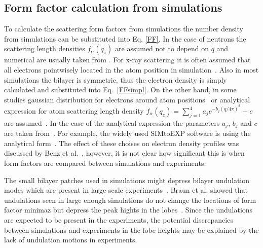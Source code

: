 \documentclass[aps,prl,superscriptaddress,twocolumn]{revtex4}
\begin{document}
\onecolumngrid
{}


\twocolumngrid

\subsection{Form factor calculation from simulations}
To calculate the scattering form factors from simulations the number density from
simulations can be substituted into Eq. \ref{FF}. In the case of neutrons the scattering 
length densities $f_\alpha(q_z)$ are assumed not to depend on $q$ and numerical are usually 
taken from \cite{??}. For x-ray scattering it is often assumed that all electrons pointwisely 
located in the atom position in simulation~\cite{??}. Also in most simulations the bilayer is symmetric,
thus the electron density is simply calculated and substituted into Eq.~\ref{FFsimpl}. 
On the other hand, in some studies gaussian distribution for electrons around atom positions~\cite{benz05} 
or analytical expression for atom scattering length density $f_\alpha(q_z)=\sum_{j=1}^4a_je^{-b_j(q/4\pi)^2}+c$
are assumed~\cite{benz05,kucerka10,??}. In the case of the analytical expression the parameters 
$a_j$, $b_j$ and $c$ are taken from~\cite{??}. For example, the widely used SIMtoEXP software is using
the analytical form~\cite{kucerka10}. The effect of these choises on electron density profiles was discussed
by Benz et al.~\cite{benz05}, however, it is not clear how significant this is when form factors are
compared between simulations and experiments.

The small bilayer patches used in simulations might depress bilayer undulation modes which are present in large 
scale experiments~\cite{braun11}. Braun et al. showed that undulations seen in large enough simulations do
not change the locations of form factor minimaz but depress the peak hights in the lobes~\cite{braun11}.
Since the undulations are expected to be present in the experiments, the potential discrepancies 
between simulations and experiments in the lobe heights may be explained by the lack of undulation 
motions in experiments.
\end{document}
